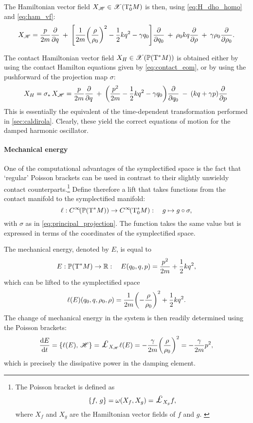 The Hamiltonian vector field $X_\mathscr{H} \in \mathscr{X}\qty(\mathrm{T}^*_0M)$ is then, using \cref{eq:H_dho_homo} and \cref{eq:ham_vf}:
$$ X_{\mathscr{H}} = \frac{p}{2m}\pdv{}{q}\: + \: \qty[\frac{1}{2m}\qty(\frac{\rho}{\rho_0})^2 - \frac{1}{2}kq^2 - \gamma q_0]\pdv{}{q_0}\: + \: \rho_0 kq \pdv{}{\rho}\: + \: \gamma \rho_0 \pdv{}{\rho_0}.$$ 

The contact Hamiltonian vector field $X_H \in \mathscr{X}\qty(\mathbb{P}\qty(\mathrm{T}^*M))$ is obtained either by using the contact Hamilton equations given by \cref{eq:contact_eom}, or by using the pushforward of the projection map $\sigma$:
$$ X_H = \sigma_*\,X_\mathscr{H} = \frac{p}{2m}\pdv{}{q}\: + \: \qty(\frac{p^2}{2m} - \frac{1}{2}kq^2 - \gamma q_0)\pdv{}{q_0}\: - \: (kq + \gamma p)\pdv{}{p}\: $$
This is essentially the equivalent of the time-dependent transformation performed in \cref{sec:caldirola}. Clearly, these yield the correct equations of motion for the damped harmonic oscillator.

\paragraph{Mechanical energy} One of the computational advantages of the symplectified space is the fact that `regular' Poisson brackets can be used in contrast to their slightly unwieldy contact counterparts.\footnote
{The Poisson bracket is defined as 
    $$ \poisson{f}{g} = \omega(X_f, X_g) = \lied{X_g}{f},$$
 where $X_f$ and $X_g$ are the Hamiltonian vector fields of $f$ and $g$. \cite{Libermann1987}
} 
Define therefore a lift that takes functions from the contact manifold to the symplectified manifold:
$$ 
    \ell : C^\infty\!\qty(\mathbb{P}\qty(\mathrm{T}^*M)) \to C^\infty\!\qty(\mathrm{T}^*_0M): \quad g \mapsto g \circ \sigma,
$$
with $\sigma$ as in \cref{eq:principal_projection}. The function takes the same value but is expressed in terms of the coordinates of the symplectified space.

The mechanical energy, denoted by $E$, is equal to 
$$ E: \mathbb{P}\qty(\mathrm{T}^*M) \to \mathbb{R}: \quad E(q_0, q, p) = \frac{p^2}{2m} + \frac{1}{2}kq^2,$$
which can be lifted to the symplectified space
$$ 
    \ell(E)(q_0, q, \rho_0, \rho) = \frac{1}{2m}\qty(-\frac{\rho}{\rho_0})^2 + \frac{1}{2}kq^2.
$$
The change of mechanical energy in the system is then readily determined using the Poisson brackets:
$$ \dv{E}{t} = \poisson{\ell(E)}{\mathscr{H}} = \lied{X_\mathscr{H}}{\ell(E)} = -\frac{\gamma}{2m}\qty(\frac{\rho}{\rho_0})^2 = -\frac{\gamma}{2m}p^2,$$
which is precisely the dissipative power in the damping element.

